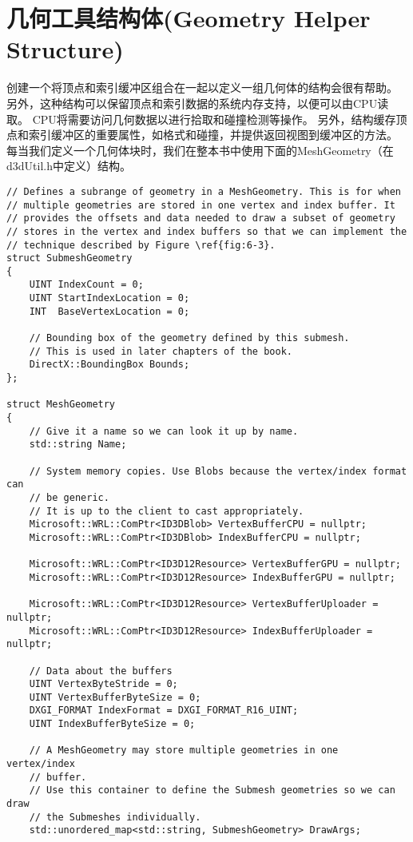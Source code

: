 \section{几何工具结构体(Geometry Helper Structure)}
\begin{flushleft}
创建一个将顶点和索引缓冲区组合在一起以定义一组几何体的结构会很有帮助。 另外，这种结构可以保留顶点和索引数据的系统内存支持，以便可以由CPU读取。 CPU将需要访问几何数据以进行拾取和碰撞检测等操作。 另外，结构缓存顶点和索引缓冲区的重要属性，如格式和碰撞，并提供返回视图到缓冲区的方法。 每当我们定义一个几何体块时，我们在整本书中使用下面的MeshGeometry（在d3dUtil.h中定义）结构。\\
\begin{lstlisting}
// Defines a subrange of geometry in a MeshGeometry. This is for when
// multiple geometries are stored in one vertex and index buffer. It
// provides the offsets and data needed to draw a subset of geometry
// stores in the vertex and index buffers so that we can implement the
// technique described by Figure \ref{fig:6-3}.
struct SubmeshGeometry
{
    UINT IndexCount = 0;
    UINT StartIndexLocation = 0;
    INT  BaseVertexLocation = 0;

    // Bounding box of the geometry defined by this submesh.
    // This is used in later chapters of the book.
    DirectX::BoundingBox Bounds;
};

struct MeshGeometry
{
    // Give it a name so we can look it up by name.
    std::string Name;

    // System memory copies. Use Blobs because the vertex/index format can
    // be generic.
    // It is up to the client to cast appropriately.
    Microsoft::WRL::ComPtr<ID3DBlob> VertexBufferCPU = nullptr;
    Microsoft::WRL::ComPtr<ID3DBlob> IndexBufferCPU = nullptr;

    Microsoft::WRL::ComPtr<ID3D12Resource> VertexBufferGPU = nullptr;
    Microsoft::WRL::ComPtr<ID3D12Resource> IndexBufferGPU = nullptr;
    
    Microsoft::WRL::ComPtr<ID3D12Resource> VertexBufferUploader = nullptr;
    Microsoft::WRL::ComPtr<ID3D12Resource> IndexBufferUploader = nullptr;
    
    // Data about the buffers
    UINT VertexByteStride = 0;
    UINT VertexBufferByteSize = 0;
    DXGI_FORMAT IndexFormat = DXGI_FORMAT_R16_UINT;
    UINT IndexBufferByteSize = 0;
    
    // A MeshGeometry may store multiple geometries in one vertex/index
    // buffer.
    // Use this container to define the Submesh geometries so we can draw
    // the Submeshes individually.
    std::unordered_map<std::string, SubmeshGeometry> DrawArgs;
    

\end{lstlisting}
\end{flushleft}

